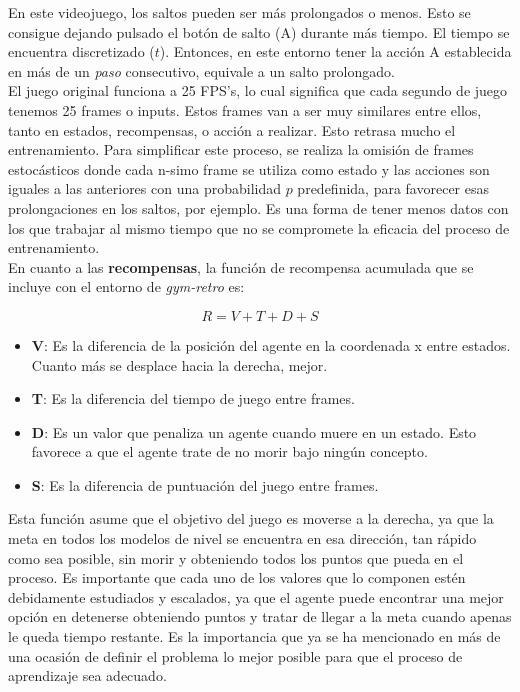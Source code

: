 \documentclass[11pt,fleqn]{book} %
\begin{document}
En este videojuego, los saltos pueden ser más prolongados o menos. Esto se consigue dejando pulsado el botón de salto (A) durante más tiempo. El tiempo se encuentra discretizado ($t$). Entonces, en este entorno tener la acción A establecida en más de un \textit{paso} consecutivo, equivale a un salto prolongado. \\

El juego original funciona a 25 FPS's, lo cual significa que cada segundo de juego tenemos 25 frames o inputs. Estos frames van a ser muy similares entre ellos, tanto en estados, recompensas, o acción a realizar. Esto retrasa mucho el entrenamiento. Para simplificar este proceso, se realiza la omisión de frames estocásticos donde cada n-simo frame se utiliza como estado y las acciones son iguales a las anteriores con una probabilidad $p$ predefinida, para favorecer esas prolongaciones en los saltos, por ejemplo. Es una forma de tener menos datos con los que trabajar al mismo tiempo que no se compromete la eficacia del proceso de entrenamiento.\\

En cuanto a las \textbf{recompensas}, la función de recompensa acumulada que se incluye con el entorno de \textit{gym-retro} es: 

\begin{equation}
R=V+T+D+S
\end{equation}

\begin{itemize}
	\item \textbf{V}: Es la diferencia de la posición del agente en la coordenada x entre estados. Cuanto más se desplace hacia la derecha, mejor. \\
	
	\item \textbf{T}: Es la diferencia del tiempo de juego entre frames. \\
	
	\item \textbf{D}: Es un valor que penaliza un agente cuando muere en un estado. Esto favorece a que el agente trate de no morir bajo ningún concepto. \\
	
	\item \textbf{S}: Es la diferencia de puntuación del juego entre frames. \\
\end{itemize}

Esta función asume que el objetivo del juego es moverse a la derecha, ya que la meta en todos los modelos de nivel se encuentra en esa dirección, tan rápido como sea posible, sin morir y obteniendo todos los puntos que pueda en el proceso. Es importante que cada uno de los valores que lo componen estén debidamente estudiados y escalados, ya que el agente puede encontrar una mejor opción en detenerse obteniendo puntos y tratar de llegar a la meta cuando apenas le queda tiempo restante. Es la importancia que ya se ha mencionado en más de una ocasión de definir el problema lo mejor posible para que el proceso de aprendizaje sea adecuado. \\
\end{document}
